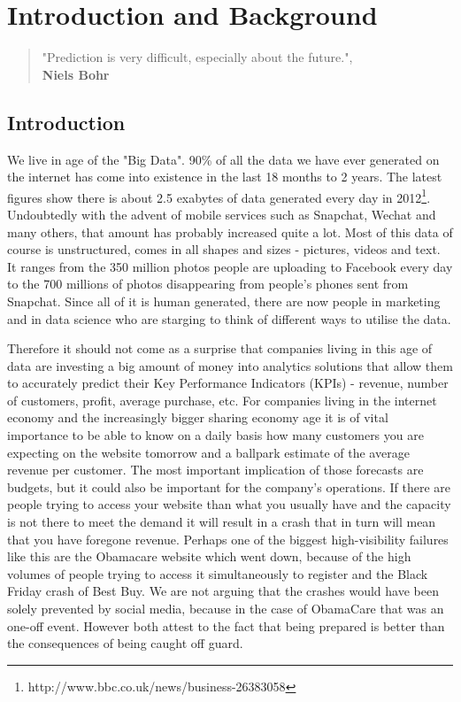 \documentclass[minf,twoside,singlespacing,parskip,notimes,deptreport]{infthesis} %
\begin{document}
\tableofcontents


\chapter{Introduction and Background}

\begin{quotation}
"Prediction is very difficult, especially about the future.", \\
\textbf{Niels Bohr}
\end{quotation}

\section{Introduction}

We live in age of the "Big Data". 90\% of all the data we have ever generated on the internet has come into existence in the last 18 months to 2 years. 
The latest figures show there is about 2.5 exabytes of data generated every day in 2012\footnote{http://www.bbc.co.uk/news/business-26383058}. 
Undoubtedly with the advent of mobile services such as Snapchat, Wechat and many others, that amount has probably increased quite a lot. 
Most of this data of course is unstructured, comes in all shapes and sizes - pictures, videos and text. 
It ranges from the 350 million photos people are uploading to Facebook every day\cite{InternetOrgWhitepaper} to the 700 millions of photos disappearing from people's phones sent from Snapchat\cite{snapchat}. 
Since all of it is human generated, there are now people in marketing and in data science who are starging to think of different ways to utilise the data. 

Therefore it should not come as a surprise that  companies living in this age of data are investing a big amount of money into analytics solutions that allow them to accurately predict their Key Performance Indicators (KPIs) - revenue, number of customers, profit, average purchase, etc. 
For companies living in the internet economy and the increasingly bigger sharing economy age it is of vital importance to be able to know on a daily basis how many customers you are expecting on the website tomorrow and a ballpark estimate of the average revenue per customer. 
The most important implication of those forecasts are budgets, but it could also be important for the company's operations. If there are people trying to access your website than what you usually have and the capacity is not there to meet the demand it will result in a crash that in turn will mean that you have foregone revenue. 
Perhaps one of the biggest high-visibility failures like this are the Obamacare website\cite{obcare} which went down, because of the high volumes of people trying to access it simultaneously to register  and the Black Friday crash of Best Buy\cite{bestbuy}. 
We are not arguing that the crashes would have been solely prevented by social media, because in the case of ObamaCare that was an one-off event. However both attest to the fact that being prepared is better than the consequences of being caught off guard. 
\end{document}
